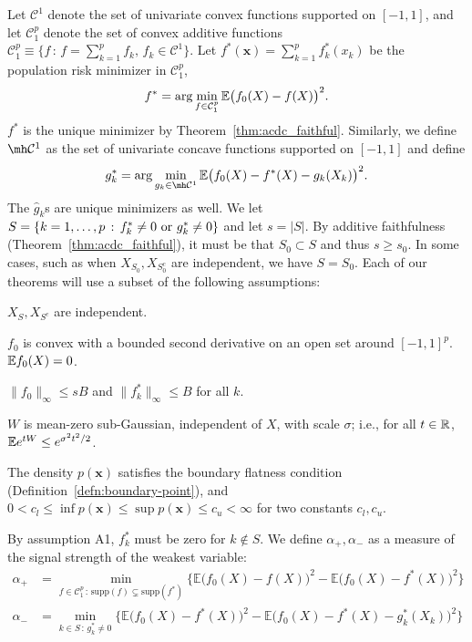 Let $\mathcal{C}^1$ denote the set of univariate convex functions
supported on $[-1,1]$, 
and let  $\mathcal{C}_1^{p}$ denote the set of convex additive functions
$\mathcal{C}_1^p \equiv \{ f \,:\, f = \sum_{k=1}^p f_k, \,
   f_k \in \mathcal{C}^1 \} $.  
Let $f^*(\mathbf{x}) = \sum_{k=1}^p f^*_k(x_k)$ be the population risk
minimizer in $\mathcal{C}_1^p$, 
\begin{equation}
f^* = \arg\min_{f \in \mathcal{C}_1^p} {\mathbb E}\big(f_0(X) - f(X)
\big)^2.
\end{equation}
$f^*$ is the unique minimizer by Theorem~\ref{thm:acdc_faithful}. Similarly, we define $\mh \mathcal{C}^1$ as the set of univariate concave functions supported on $[-1, 1]$ and define
\begin{equation}
g^*_k = \arg\min_{g_k \in \mh \mathcal{C}^1} \E \big( f_0(X) - f^*(X)
- g_k(X_k) \big)^2.
\end{equation}
The $\hat{g}_k$s are unique minimizers as well. We let $S = \{ k =
1,\ldots,p \,:\, f^*_k \neq 0 \textrm{ or } g^*_k \neq 0\}$ and let $s =
|S|$. By additive faithfulness (Theorem~\ref{thm:acdc_faithful}), it
must be that $S_0 \subset S$ and thus $s \geq s_0$. In some cases,
such as when $X_{S_0}, X_{S^c_0}$ are independent, we have $S = S_0$.
Each of our theorems will use a subset of the following assumptions:
\begin{packed_enum}
\item[A1:] $X_S, X_{S^c}$ are independent. 
\item[A2:] $f_0$ is convex with a bounded second derivative on an open set around $[-1,1]^p$. ${\mathbb E} f_0(X) = 0$.
\item[A3:] $\|f_0\|_\infty \leq sB$ and $\| f^*_k \|_\infty \leq B$ for all $k$.
\item[A4:] $W$ is mean-zero sub-Gaussian, independent of $X$, with scale $\sigma$; i.e., for all $t \in {\mathbb R}$, ${\mathbb E} e^{t W} \leq e^{\sigma^2 t^2 / 2}$.
\item[A5:] The density $p(\mathbf{x})$ satisfies the boundary flatness condition (Definition~\ref{defn:boundary-point}), and $0 < c_l \leq \inf p(\mathbf{x}) \leq \sup p(\mathbf{x}) \leq c_u < \infty$ for two constants $c_l, c_u$. 
\end{packed_enum}
By assumption A1, $f^*_k$ must be zero for $k\notin S$.
We define $\alpha_{+}, \alpha_{-}$ as a measure of the signal strength of the weakest variable:
\begin{align}
\alpha_{+} &= \min_{f \in \mathcal{C}_1^p \,:\, \textrm{supp}(f) \subsetneq \textrm{supp}(f^*)} 
       \Big\{ \mathbb{E} \big( f_0(X) - f(X) \big)^2 - 
        \mathbb{E} \big( f_0(X) - f^*(X) \big)^2  \Big\} \label{eqn:signal_level_defn} \\
\alpha_{-} &=   \min_{k \in S \,:\, g^*_k \neq 0}
      \Big\{ \mathbb{E} \big( f_0(X) - f^*(X) \big)^2 - 
    \mathbb{E} \big( f_0(X) - f^*(X) - g^*_k(X_k) \big)^2 \Big\} \nonumber
\end{align}
